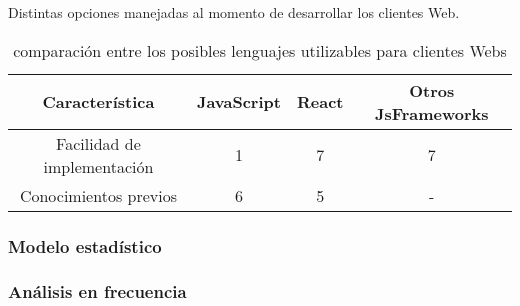     \begin{table}[ht]
        \caption[Comparativa de posibles lenguajes nivel cliente Web]{comparación entre
        los posibles lenguajes utilizables para clientes Webs}
        \label{tab:LenguajesCliente}
        \begin{center}
            Distintas opciones manejadas al momento de desarrollar los clientes Web.\\

            \vspace{0.3cm}
            \begin{tabular}{|c|c|c|c|}
                \hline
                Característica              & JavaScript & React & Otros JsFrameworks\\\hline
                Facilidad de implementación & 1         & 7     &  7\\\hline
                Conocimientos previos       & 6         & 5     &  - \\\hline
            \end{tabular}
        \end{center}
    \end{table}



    \subsubsection{Modelo estadístico}

    \subsubsection{Análisis en frecuencia}


